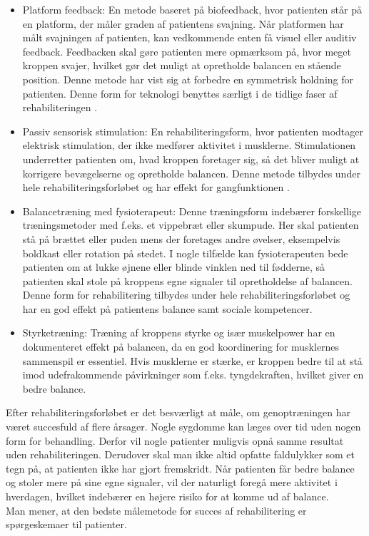 \begin{itemize}
\item Platform feedback: En metode baseret på biofeedback, hvor patienten står på en platform, der måler graden af patientens svajning. Når platformen har målt svajningen af patienten, kan vedkommende enten få visuel eller auditiv feedback. Feedbacken skal gøre patienten mere opmærksom på, hvor meget kroppen svajer, hvilket gør det muligt at opretholde balancen en stående position. Denne metode har vist sig at forbedre en symmetrisk holdning for patienten. \cite{Barclay-Goddard2004} Denne form for teknologi benyttes særligt i de tidlige faser af rehabiliteringen \cite{Sundhedsstyrelsen2011a}.
\item Passiv sensorisk stimulation: En rehabiliteringsform, hvor patienten modtager elektrisk stimulation, der ikke medfører aktivitet i musklerne. Stimulationen underretter patienten om, hvad kroppen foretager sig, så det bliver muligt at korrigere bevægelserne og opretholde balancen. \cite{Sundhedsstyrelsen2010} Denne metode tilbydes under hele rehabiliteringsforløbet og har effekt for gangfunktionen \cite{Sundhedsstyrelsen2011a}.
\item Balancetræning med fysioterapeut: Denne træningsform indebærer forskellige træningsmetoder med f.eks. et vippebræt eller skumpude. Her skal patienten stå på brættet eller puden mens der foretages andre øvelser, eksempelvis boldkast eller rotation på stedet. I nogle tilfælde kan fysioterapeuten bede patienten om at lukke øjnene eller blinde vinklen ned til fødderne, så patienten skal stole på kroppens egne signaler til opretholdelse af balancen. \cite{Joergensen2004} Denne form for rehabilitering tilbydes under hele rehabiliteringsforløbet og har en god effekt på patientens balance samt sociale kompetencer. \cite{Sundhedsstyrelsen2011a}
\item Styrketræning: Træning af kroppens styrke og især muskelpower har en dokumenteret effekt på balancen, da en god koordinering for musklernes sammenspil er essentiel. Hvis musklerne er stærke, er kroppen bedre til at stå imod udefrakommende påvirkninger som f.eks. tyngdekraften, hvilket giver en bedre balance. \cite{Joergensen2004}
\end{itemize}

Efter rehabiliteringsforløbet er det besværligt at måle, om genoptræningen har været succesfuld af flere årsager. Nogle sygdomme kan læges over tid uden nogen form for behandling. Derfor vil nogle patienter muligvis opnå samme resultat uden rehabiliteringen. Derudover skal man ikke altid opfatte faldulykker som et tegn på, at patienten ikke har gjort fremskridt. Når patienten får bedre balance og stoler mere på sine egne signaler, vil der naturligt foregå mere aktivitet i hverdagen, hvilket indebærer en højere risiko for at komme ud af balance. \cite{Hain2008} \\
Man mener, at den bedste målemetode for succes af rehabilitering er spørgeskemaer til patienter. \cite{Hain2008}